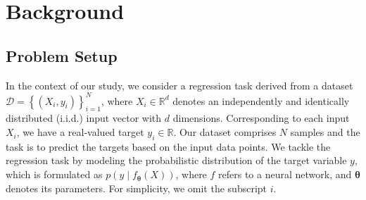 \section{Background}
\subsection{Problem Setup}
In the context of our study, we consider a regression task derived from a dataset $\mathcal{D}=\left\{\left(X_i, y_i\right)\right\}_{i=1}^N$, where $X_i \in \mathbb{R}^d$ denotes an independently and identically distributed (i.i.d.) input vector with $d$ dimensions. Corresponding to each input $X_i$, we have a real-valued target $y_i \in \mathbb{R}$. Our dataset comprises $N$ samples and the task is to predict the targets based on the input data points. We tackle the regression task by modeling the probabilistic distribution of the target variable $y$, which is formulated as $p\left(y \mid f_{\boldsymbol{\theta}}(X)\right)$, where $f$ refers to a neural network, and $\boldsymbol{\theta}$ denotes its parameters. For simplicity, we omit the subscript $i$.







